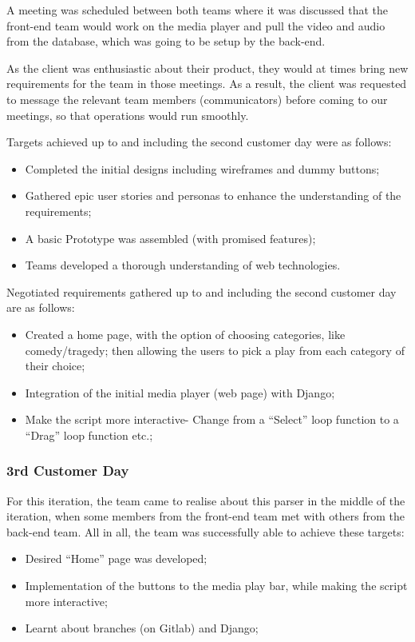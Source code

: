\documentclass{l3proj}
\begin{document}
A meeting was scheduled between both teams where it was discussed that the front-end team would work on the media player and pull the video and audio from the database, which was going to be setup by the back-end. 

As the client was enthusiastic about their product, they would at times bring new requirements for the team in those meetings. As a result, the client was requested to message the relevant team members (communicators) before coming to our meetings, so that operations would run smoothly.

Targets achieved up to and including the second customer day were as follows:

 \begin{itemize}
\item Completed the initial designs including wireframes and dummy buttons;  \cite{wireframes}
\item Gathered epic user stories and personas to enhance the understanding of the requirements;
\item A basic Prototype was assembled (with promised features);
\item Teams developed a thorough understanding of web technologies.
 \end{itemize}

Negotiated requirements gathered up to and including the second customer day are as follows:
 \begin{itemize}
\item  Created a home page, with the option of choosing categories, like comedy/tragedy; then allowing the users to pick a play from each category of their choice;
\item  Integration of the initial media player (web page) with Django;
\item  Make the script more interactive-  Change from a “Select” loop function to a “Drag” loop function etc.;
 \end{itemize}

\subsubsection{3rd Customer Day}

For this iteration, the team came to realise about this parser in the middle of the iteration, when some members from the front-end team met with others from the back-end team. 
All in all, the team was successfully able to achieve these targets:
\begin{itemize}
\item Desired “Home” page was developed;
\item  Implementation of the buttons to the media play bar, while making the script more interactive;
\item Learnt about branches (on Gitlab) and Django;
\end{itemize}
\end{document}
